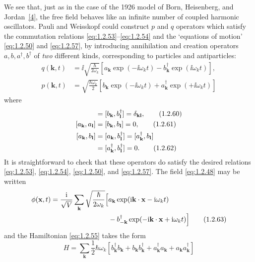 We see that, just as in the case of the 1926 model of Born, Heisenberg, and
Jordan~\hyperref[ref:1.4]{[4]}, the free field behaves like an infinite number of coupled harmonic
oscillators. Pauli and Weisskopf could construct $p$ and $q$ operators which
satisfy the commutation relations \eqref{eq:1.2.53}--\eqref{eq:1.2.54} and the `equations of
motion' \eqref{eq:1.2.50} and \eqref{eq:1.2.57}, by introducing annihilation and creation
operators $a,b,a^{\dagger},b^{\dagger}$ of \emph{two} different kinds,
corresponding to particles and antiparticles:
\begin{align}
  q(\mathbf k,t)&=\ii\sqrt{\frac{\hbar}{2\omega_k}}
  \left[a_{\mathbf k}\exp(-\ii\omega_kt)
       -b^{\dagger}_{\mathbf k}\exp(\ii\omega_kt)\right],
  \tag{1.2.58}\label{eq:1.2.58}\\
  p(\mathbf k,t)&=\sqrt{\frac{\hbar\omega_k}{2}}
  \left[b_{\mathbf k}\exp(-\ii\omega_kt)
       +a^{\dagger}_{\mathbf k}\exp(+\ii\omega_kt)\right]
  \tag{1.2.59}\label{eq:1.2.59}
\end{align}
where
\begin{align}
  [a_{\mathbf k},a^{\dagger}_{\mathbf l}]
    &=[b_{\mathbf k},b^{\dagger}_{\mathbf l}]=\delta_{\mathbf k\mathbf l},
  \tag{1.2.60}\label{eq:1.2.60}\\
  [a_{\mathbf k},a_{\mathbf l}]
    &=[b_{\mathbf k},b_{\mathbf l}]=0,
  \tag{1.2.61}\label{eq:1.2.61}\\
  [a_{\mathbf k},b_{\mathbf l}]
    &=[a_{\mathbf k},b^{\dagger}_{\mathbf l}]
     =[a^{\dagger}_{\mathbf k},b_{\mathbf l}]
  \notag\\
    &=[a^{\dagger}_{\mathbf k},b^{\dagger}_{\mathbf l}]=0.
  \tag{1.2.62}\label{eq:1.2.62}
\end{align}
It is straightforward to check that these operators do satisfy the desired
relations \eqref{eq:1.2.53}, \eqref{eq:1.2.54}, \eqref{eq:1.2.50}, and \eqref{eq:1.2.57}. The field \eqref{eq:1.2.48} may
be written
\begin{align}
  \phi(\mathbf x,t)=\frac{\mathrm{i}}{\sqrt V}\sum_{\mathbf k}
  \sqrt{\frac{\hbar}{2\omega_k}}\Bigl[
    &a_{\mathbf k}\exp(\mathrm{i}\mathbf k\cdot\mathbf x-\mathrm{i}\omega_kt)
  \notag\\
    &-b^{\dagger}_{-\mathbf k}
      \exp(-\mathrm{i}\mathbf k\cdot\mathbf x+\mathrm{i}\omega_kt)\Bigr]
  \tag{1.2.63}\label{eq:1.2.63}
\end{align}
and the Hamiltonian \eqref{eq:1.2.55} takes the form
\[
  H=\sum_{\mathbf k}\frac12\hbar\omega_k
  \left[b^{\dagger}_{\mathbf k}b_{\mathbf k}
       +b_{\mathbf k}b^{\dagger}_{\mathbf k}
       +a^{\dagger}_{\mathbf k}a_{\mathbf k}
       +a_{\mathbf k}a^{\dagger}_{\mathbf k}\right]
\]

